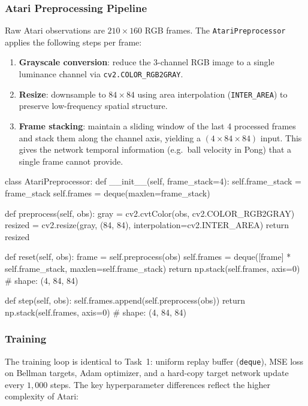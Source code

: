 \documentclass[12pt,a4paper]{report}
\begin{document}
\subsubsection*{Atari Preprocessing Pipeline}

Raw Atari observations are $210 \times 160$ RGB frames.
The \texttt{AtariPreprocessor} applies the following steps per frame:

\begin{enumerate}[leftmargin=2em]
  \item \textbf{Grayscale conversion}: reduce the 3-channel RGB image to a single
        luminance channel via \texttt{cv2.COLOR\_RGB2GRAY}.
  \item \textbf{Resize}: downsample to $84 \times 84$ using area interpolation
        (\texttt{INTER\_AREA}) to preserve low-frequency spatial structure.
  \item \textbf{Frame stacking}: maintain a sliding window of the last 4 processed frames
        and stack them along the channel axis, yielding a $(4 \times 84 \times 84)$ input.
        This gives the network temporal information (e.g.\ ball velocity in Pong)
        that a single frame cannot provide.
\end{enumerate}

\begin{pycode}
class AtariPreprocessor:
    def __init__(self, frame_stack=4):
        self.frame_stack = frame_stack
        self.frames = deque(maxlen=frame_stack)

    def preprocess(self, obs):
        gray    = cv2.cvtColor(obs, cv2.COLOR_RGB2GRAY)
        resized = cv2.resize(gray, (84, 84), interpolation=cv2.INTER_AREA)
        return resized

    def reset(self, obs):
        frame = self.preprocess(obs)
        self.frames = deque([frame] * self.frame_stack, maxlen=self.frame_stack)
        return np.stack(self.frames, axis=0)    # shape: (4, 84, 84)

    def step(self, obs):
        self.frames.append(self.preprocess(obs))
        return np.stack(self.frames, axis=0)    # shape: (4, 84, 84)
\end{pycode}

\subsubsection*{Training}

The training loop is identical to Task~1: uniform replay buffer (\texttt{deque}),
MSE loss on Bellman targets, Adam optimizer, and a hard-copy target network update
every $1{,}000$ steps.
The key hyperparameter differences reflect the higher complexity of Atari:
\end{document}
